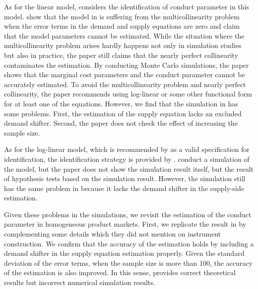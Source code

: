 \documentclass[11pt, a4paper]{article}
\begin{document}
As for the linear model, \citet{bresnahan1982oligopoly} considers the identification of conduct parameter in this model. 
\citet{perloff2012collinearity} show that the model in \citet{bresnahan1982oligopoly} is suffering from the multicollinearity problem when the error terms in the demand and supply equations are zero and claim that the model parameters cannot be estimated.
While the situation where the multicollinearity problem arises hardly happens not only in simulation studies but also in practice, the paper still claims that the nearly perfect collinearity contaminates the estimation.
By conducting Monte Carlo simulations, the paper shows that the marginal cost parameters and the conduct parameter cannot be accurately estimated.
To avoid the multicollinearity problem and nearly perfect collinearity, the paper recommends using log-linear or some other functional form for at least one of the equations.
However, we find that the simulation in \cite{perloff2012collinearity} has some problems.
First, the estimation of the supply equation lacks an excluded demand shifter.
Second, the paper does not check the effect of increasing the sample size. 

As for the log-linear model, which is recommended by \cite{perloff2012collinearity} as a valid specification for identification, the identification strategy is provided by \citet{lau1982identifying}.
\cite{hyde1995can} conduct a simulation of the model, but the paper does not show the simulation result itself, but the result of hypothesis tests based on the simulation result.
However, the simulation still has the same problem in \cite{perloff2012collinearity} because it lacks the demand shifter in the supply-side estimation.

Given these problems in the simulations, we revisit the estimation of the conduct parameter in homogeneous product markets.
First, we replicate the result in \cite{perloff2012collinearity} by complementing some details which they did not mention on instrument construction. 
We confirm that the accuracy of the estimation holds by including a demand shifter in the supply equation estimation properly. 
Given the standard deviation of the error terms, when the sample size is more than 100, the accuracy of the estimation is also improved.
In this sense, \cite{perloff2012collinearity} provides correct theoretical results but incorrect numerical simulation results.
\end{document}
